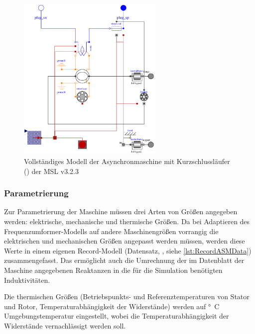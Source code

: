 \begin{figure}
\centering
\includegraphics[height=8cm]{Bilder/AIM_SquirrelCage.pdf}
\caption{Vollständiges Modell der Asynchronmaschine mit Kurzschlussläufer () der MSL v3.2.3}
\label{fig:ASM_vollstaendig}
\end{figure}


\subsubsection{Parametrierung}\label{sec:parametrierung-ASM}

Zur Parametrierung der Maschine müssen drei Arten von Größen angegeben werden: elektrische, mechanische und thermische Größen. Da bei Adaptieren des Fre­quenz­um­for­mer-Modells auf andere Maschinengrößen vorrangig die elektrischen und mechanischen Größen angepasst werden müssen, werden diese Werte in einem eigenen Record-Modell (Datensatz, , siehe \cref{lst:RecordASMData}) zusammengefasst. Das ermöglicht auch die Umrechnung der im Datenblatt der Maschine angegebenen Reaktanzen in die für die Simulation benötigten Induktivitäten.

Die thermischen Größen (Betriebspunkts- und Referenztemperaturen von Stator und Rotor, Temperaturabhängigkeit der Widerstände) werden auf \unit[20]{°C} Umgebungstemperatur eingestellt, wobei die Temperaturabhängigkeit der Widerstände vernachlässigt werden soll.

